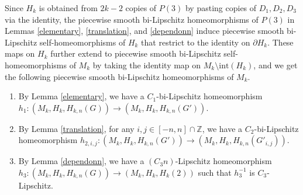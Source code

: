 \documentclass{amsart}
\begin{document}
Since $H_k$ is obtained from $2k-2$ copies of $P(3)$ by pasting copies of $D_1,D_2,D_3$ via the identity, the piecewise smooth bi-Lipschitz homeomorphisms of $P(3)$ in Lemmas \ref{elementary}, \ref{translation}, and \ref{dependonn} induce piecewise smooth bi-Lipschitz self-homeomorphisms of $H_k$ that restrict to the identity on $\partial H_k$. These maps on $H_k$ further extend to piecewise smooth bi-Lipschitz self-homeomorphisms of $M_k$ by taking the identity map on $M_k\setminus \text{int}(H_k)$, and we get the following piecewise smooth bi-Lipschitz homeomorphisms of $M_k$.
\begin{enumerate}
\item By Lemma \ref{elementary}, we have a $C_1$-bi-Lipschitz homeomorphism $h_1:(M_k, H_k,H_{k,n}(G))\to (M_k, H_k,H_{k,n}(G'))$.
\item By Lemma \ref{translation}, for any $i,j\in [-n,n]\cap \mathbb{Z}$, we have a $C_2$-bi-Lipschitz homeomorphism $h_{2,i,j}:(M_k, H_k,H_{k,n}(G'))\to (M_k, H_k,H_{k,n}(G'_{i,j}))$.
\item By Lemma \ref{dependonn}, we have a $(C_3n)$-Lipschitz homeomorphism $h_3:(M_k, H_k,H_{k,n}(G))\to (M_k, H_k,H_k(2))$ such that $h_3^{-1}$ is $C_3$-Lipschitz.
\end{enumerate}
\end{document}
